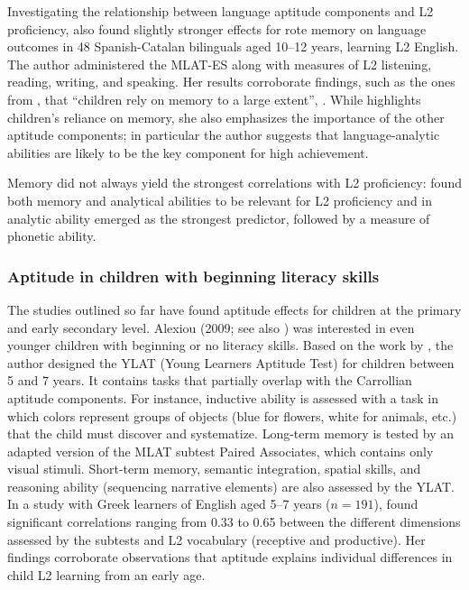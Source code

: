 \documentclass[output=paper]{langscibook}
\begin{document}
Investigating the relationship between language aptitude components and L2 proficiency, \citet{Munoz2014} also found slightly stronger effects for rote memory on language outcomes in 48 Spanish-Catalan bilinguals aged 10--12 years, learning L2 English. The author administered the MLAT-ES along with measures of L2 listening, reading, writing, and speaking. Her results corroborate findings, such as the ones from \citet{SuarezVilagran2010}, that “children rely on memory to a large extent”, \citep[64]{Munoz2014}. While \citet{Munoz2014} highlights children’s reliance on memory, she also emphasizes the importance of the other aptitude components; in particular the author suggests that language-analytic abilities are likely to be the key component for high achievement. 

Memory did not always yield the strongest correlations with L2 proficiency: \citet[140]{KissNikolov2005} found both memory and analytical abilities to be relevant for L2 proficiency and in \citet{RoehrBrackinTellier2019} analytic ability emerged as the strongest predictor, followed by a measure of phonetic ability.

\subsubsection{Aptitude in children with beginning literacy skills} %

The studies outlined so far have found aptitude effects for children at the primary and early secondary level. Alexiou (2009; see also \citealt{MiltonAlexiou2006}) was interested in even younger children with beginning or no literacy skills. Based on the work by \citet{EsserKossling1986}, the author designed the YLAT (Young Learners Aptitude Test) for children between 5 and 7 years. It contains tasks that partially overlap with the Carrollian aptitude components. For instance, inductive ability is assessed with a task in which colors represent groups of objects (blue for flowers, white for animals, etc.) that the child must discover and systematize. Long-term memory is tested by an adapted version of the MLAT subtest Paired Associates, which contains only visual stimuli. Short-term memory, semantic integration, spatial skills, and reasoning ability (sequencing narrative elements) are also assessed by the YLAT. In a study with Greek learners of English aged 5--7 years ($n=191$), \citet{Alexiou2009} found significant correlations ranging from 0.33 to 0.65 between the different dimensions assessed by the subtests and L2 vocabulary (receptive and productive). Her findings corroborate observations that aptitude explains individual differences in child L2 learning from an early age. 
\end{document}
